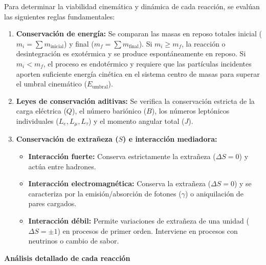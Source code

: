 \begin{problema}
Para determinar la viabilidad cinemática y dinámica de cada reacción, se evalúan las siguientes reglas fundamentales:
\begin{enumerate}[label=\arabic*.]
    \item \textbf{Conservación de energía:} Se comparan las masas en reposo totales inicial ($m_i = \sum m_{\text{inicial}}$) y final ($m_f = \sum m_{\text{final}}$). Si $m_i \ge m_f$, la reacción o desintegración es exotérmica y se produce espontáneamente en reposo. Si $m_i < m_f$, el proceso es endotérmico y requiere que las partículas incidentes aporten suficiente energía cinética en el sistema centro de masas para superar el umbral cinemático ($E_{\text{umbral}}$).
    \item \textbf{Leyes de conservación aditivas:} Se verifica la conservación estricta de la carga eléctrica ($Q$), el número bariónico ($B$), los números leptónicos individuales ($L_e, L_\mu, L_\tau$) y el momento angular total ($J$).
    \item \textbf{Conservación de extrañeza ($S$) e interacción mediadora:}
    \begin{itemize}
        \item \textbf{Interacción fuerte:} Conserva estrictamente la extrañeza ($\Delta S = 0$) y actúa entre hadrones.
        \item \textbf{Interacción electromagnética:} Conserva la extrañeza ($\Delta S = 0$) y se caracteriza por la emisión/absorción de fotones ($\gamma$) o aniquilación de pares cargados.
        \item \textbf{Interacción débil:} Permite variaciones de extrañeza de una unidad ($\Delta S = \pm 1$) en procesos de primer orden. Interviene en procesos con neutrinos o cambio de sabor.
    \end{itemize}
\end{enumerate}

\textbf{Análisis detallado de cada reacción}


\end{problema}

